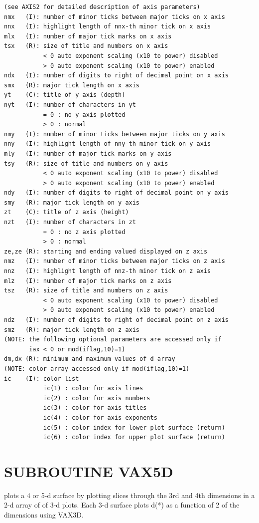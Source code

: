 \documentclass[11pt]{report}
\begin{document}
\begin{verbatim}
(see AXIS2 for detailed description of axis parameters)
nmx   (I): number of minor ticks between major ticks on x axis
nnx   (I): highlight length of nnx-th minor tick on x axis
mlx   (I): number of major tick marks on x axis
tsx   (R): size of title and numbers on x axis
           < 0 auto exponent scaling (x10 to power) disabled
           > 0 auto exponent scaling (x10 to power) enabled
ndx   (I): number of digits to right of decimal point on x axis
smx   (R): major tick length on x axis
yt    (C): title of y axis (depth)
nyt   (I): number of characters in yt
           = 0 : no y axis plotted
           > 0 : normal
nmy   (I): number of minor ticks between major ticks on y axis
nny   (I): highlight length of nny-th minor tick on y axis
mly   (I): number of major tick marks on y axis
tsy   (R): size of title and numbers on y axis
           < 0 auto exponent scaling (x10 to power) disabled
           > 0 auto exponent scaling (x10 to power) enabled
ndy   (I): number of digits to right of decimal point on y axis
smy   (R): major tick length on y axis
zt    (C): title of z axis (height)
nzt   (I): number of characters in zt
           = 0 : no z axis plotted
           > 0 : normal
ze,ze (R): starting and ending valued displayed on z axis
nmz   (I): number of minor ticks between major ticks on z axis
nnz   (I): highlight length of nnz-th minor tick on z axis
mlz   (I): number of major tick marks on z axis
tsz   (R): size of title and numbers on z axis
           < 0 auto exponent scaling (x10 to power) disabled
           > 0 auto exponent scaling (x10 to power) enabled
ndz   (I): number of digits to right of decimal point on z axis
smz   (R): major tick length on z axis
(NOTE: the following optional parameters are accessed only if
       iax < 0 or mod(iflag,10)=1)
dm,dx (R): minimum and maximum values of d array
(NOTE: color array accessed only if mod(iflag,10)=1)
ic    (I): color list
           ic(1) : color for axis lines
           ic(2) : color for axis numbers
           ic(3) : color for axis titles
           ic(4) : color for axis exponents
           ic(5) : color index for lower plot surface (return)
           ic(6) : color index for upper plot surface (return)
\end{verbatim}

\newpage
\section{SUBROUTINE VAX5D}

 plots a 4 or 5-d surface by plotting slices through the 3rd and
4th dimensions in a 2-d array of of 3-d plots. Each 3-d surface
plots d(*) as a function of 2 of the dimensions using VAX3D.
\end{document}
